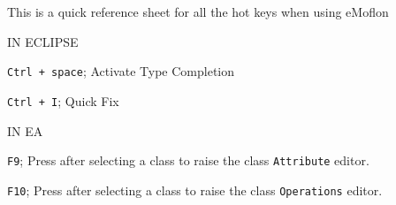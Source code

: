 This is a quick reference sheet for all the hot keys when using eMoflon


IN ECLIPSE

\texttt{Ctrl + space}; Activate Type Completion

\texttt{Ctrl + I}; Quick Fix 

IN EA

\texttt{F9}; Press after selecting a class to raise the class \texttt{Attribute} editor.

\texttt{F10}; Press after selecting a class to raise the class \texttt{Operations} editor.
